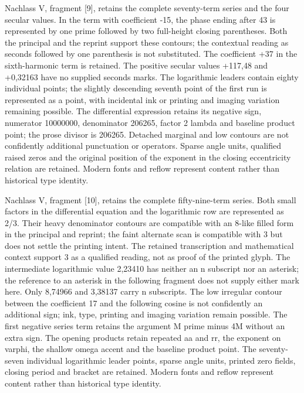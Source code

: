 Nachlass V, fragment [9], retains the complete seventy-term series and the four secular values. In the term with coefficient -15, the phase ending after 43 is represented by one prime followed by two full-height closing parentheses. Both the principal and the reprint support these contours; the contextual reading as seconds followed by one parenthesis is not substituted. The coefficient +37 in the sixth-harmonic term is retained. The positive secular values +117,48 and +0,32163 have no supplied seconds marks. The logarithmic leaders contain eighty individual points; the slightly descending seventh point of the first run is represented as a point, with incidental ink or printing and imaging variation remaining possible. The differential expression retains its negative sign, numerator 10000000, denominator 206265, factor 2 lambda and baseline product point; the prose divisor is 206265. Detached marginal and low contours are not confidently additional punctuation or operators. Sparse angle units, qualified raised zeros and the original position of the exponent in the closing eccentricity relation are retained. Modern fonts and reflow represent content rather than historical type identity.

Nachlass V, fragment [10], retains the complete fifty-nine-term series. Both small factors in the differential equation and the logarithmic row are represented as 2/3. Their heavy denominator contours are compatible with an 8-like filled form in the principal and reprint; the faint alternate scan is compatible with 3 but does not settle the printing intent. The retained transcription and mathematical context support 3 as a qualified reading, not as proof of the printed glyph. The intermediate logarithmic value 2,23410 has neither an n subscript nor an asterisk; the reference to an asterisk in the following fragment does not supply either mark here. Only 8,74966 and 3,38137 carry n subscripts. The low irregular contour between the coefficient 17 and the following cosine is not confidently an additional sign; ink, type, printing and imaging variation remain possible. The first negative series term retains the argument M prime minus 4M without an extra sign. The opening products retain repeated aa and rr, the exponent on varphi, the shallow omega accent and the baseline product point. The seventy-seven individual logarithmic leader points, sparse angle units, printed zero fields, closing period and bracket are retained. Modern fonts and reflow represent content rather than historical type identity.

